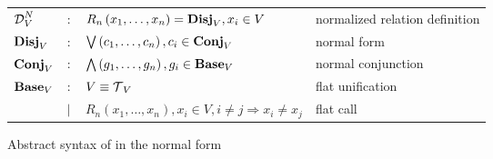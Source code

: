 \begin{figure*}[t!]
    \begin{tabular}{llll}
        $\operatorname{\mathcal{D}}_{V}^N$ & $:$    & $R_{n}\left( x_1, \ldots, x_{n} \right) = \operatorname{\mathbf{Disj}}_{V}, x_{i}\in V$                        & normalized relation definition \\
        $\operatorname{\mathbf{Disj}}_{V}$  & $:$    & $\bigvee\left( c_1, \ldots, c_{n} \right), c_{i}\in \operatorname{\mathbf{Conj}}_{V}$                          & normal form                    \\
        $\operatorname{\mathbf{Conj}}_{V}$  & $:$    & $\bigwedge\left( g_1, \ldots, g_n \right), g_{i}\in \operatorname{\mathbf{Base}}_{V}$                          & normal conjunction             \\
        $\operatorname{\mathbf{Base}}_{V}$  & $:$    & $V \equiv \operatorname{\mathcal{T}}_{V}$                                                                & flat unification               \\
                     & $\mid$ & $R_{n}\left( x_1, \ldots, x_{n} \right), x_{i}\in V, i \neq j \Rightarrow x_i \neq x_j$ & flat call                      \\

    \end{tabular}
    \caption{Abstract syntax of \micro in the normal form}
    \label{fig:miniKanren}
\end{figure*}
